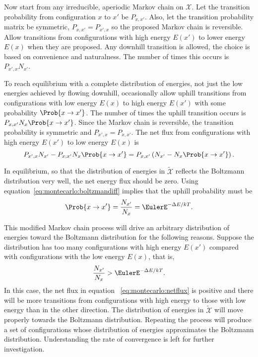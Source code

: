\documentclass[12pt]{article}
\begin{document}
Now start from any irreducible, aperiodic Markov chain on \( \mathcal{X}
\).  Let the transition probability from configuration \( x \) to \( x' \)
be \( P_{x, x'} \).  Also, let the transition probability matrix be
symmetric, \( P_{x, x'} = P_{x', x} \) so the proposed Markov chain is
reversible.  Allow transitions from configurations with high energy \( E
(x') \) to lower energy \( E(x) \) when they are proposed.  Any downhill
transition is allowed, the choice is based on convenience and
naturalness.  The number of times this occurs is \( P_{x', x} N_{x'} \).

To reach equilibrium with a complete distribution of energies, not just
the low energies achieved by flowing downhill, occasionally allow uphill
transitions from configurations with low energy \( E(x) \) to high
energy \( E(x') \) with some probability \( \Prob{x \to x'} \).  The
number of times the uphill transition occurs is \( P_{x, x'} N_{x}\Prob{x
\to x'} \).  Since the Markov chain is reversible, the transition
probability is symmetric and \( P_{x', x} = P_{x, x'} \).  The net flux
from configurations with high energy \( E(x') \) to low energy \( E(x) \)
is
\begin{equation}
    \label{eq:montecarlo:netflux} P_{x', x} N_{x'} - P_{x,x'}N_x \Prob{x
    \to x'} = P_{x, x'} \left( N_{x'} - N_{x} \Prob{x \to x'}\right).
\end{equation}

In equilibrium, so that the distribution of energies in \( \tilde{\mathcal
{X}} \) reflects the Boltzmann distribution very well, the net energy
flux should be zero.  Using equation~\eqref{eq:montecarlo:boltzmandiff}
implies that the uphill probability must be
\[
    \Prob{x \to x'} = \frac{N_{x'}}{N_{x}} = \EulerE^{-\Delta E/kT}.
\]

This modified Markov chain process will drive an arbitrary distribution
of energies toward the Boltzmann distribution for the following reasons.
Suppose the distribution has too many configurations with high energy \(
E(x') \) compared with configurations with the low energy \( E(x) \),
that is,
\[
    \frac{N_{x'}}{N_{x}} > \EulerE^{-\Delta E/kT}.
\] In this case, the net flux in equation~%
\ref{eq:montecarlo:netflux} is positive and there will be more
transitions from configurations with high energy to those with low
energy than in the other direction.  The distribution of energies in \(
\tilde{\mathcal {X}} \) will move properly towards the Boltzmann
distribution.  Repeating the process will produce a set of
configurations whose distribution of energies approximates the Boltzmann
distribution.  Understanding the rate of convergence is left for further
investigation.
\end{document}
